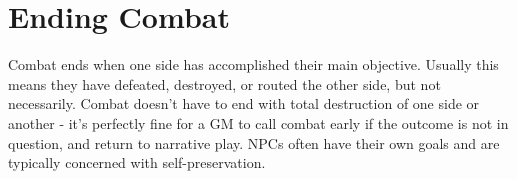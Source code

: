 \section{Ending Combat}
Combat ends when one side has accomplished their main objective. Usually this means they have defeated, destroyed, or routed the other side, but not necessarily. Combat doesn't have to end with total destruction of one side or another - it's perfectly fine for a GM to call combat early if the outcome is not in question, and return to narrative play. NPCs often have their own goals and are typically concerned with self-preservation. 